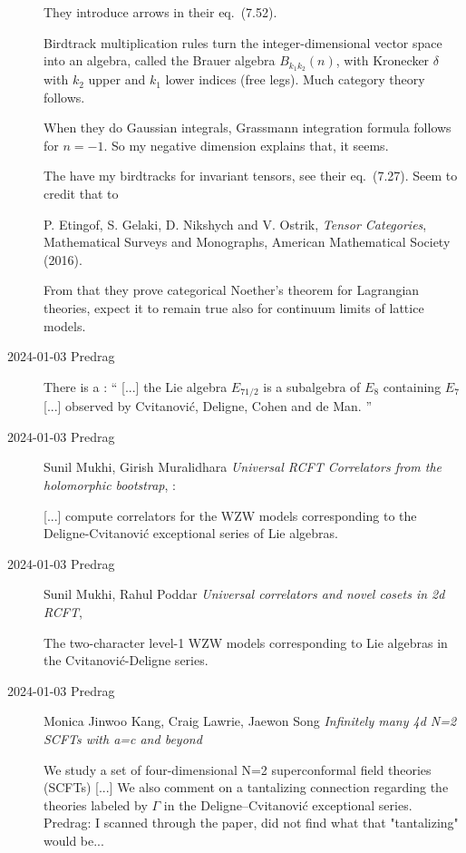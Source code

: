\begin{description}
They introduce arrows in their eq.~(7.52).

Birdtrack multiplication rules turn the integer-dimensional vector space into an algebra,
called the Brauer algebra $B_{k_1k_2}(n)$, with Kronecker $\delta$ with
 $k_2$ upper and  $k_1$  lower indices (free legs).  Much category theory follows.

When they do Gaussian integrals, Grassmann integration formula follows for
$n=-1$. So my negative dimension explains that, it seems.

The have my birdtracks for invariant tensors, see their eq.~(7.27).
Seem to credit that to

P. Etingof, S. Gelaki, D. Nikshych and V. Ostrik,
{\em Tensor Categories}, Mathematical Surveys
and Monographs, American Mathematical Society (2016).

From that they prove categorical Noether's theorem for Lagrangian theories,
expect it to
remain true also for continuum limits of lattice models.

\item[2024-01-03 Predrag]
There is a
:
``
[...] the Lie algebra $E_{7 1/2}$ is a subalgebra of $E_{8}$ containing
$E_{7}$ [...] observed by Cvitanovi{\'c}, Deligne, Cohen and de Man.
''


\item[2024-01-03 Predrag]
Sunil Mukhi, Girish Muralidhara
{\em Universal RCFT Correlators from the holomorphic bootstrap},
:

[...] compute
correlators for the WZW models corresponding to the
Deligne-Cvitanovi{\'c} exceptional series of Lie algebras.

\item[2024-01-03 Predrag]
Sunil Mukhi, Rahul Poddar
{\em Universal correlators and novel cosets in 2d RCFT},

The two-character level-1 WZW models corresponding to Lie algebras in the
Cvitanovi{\'c}-Deligne series.

\item[2024-01-03 Predrag]
Monica Jinwoo Kang, Craig Lawrie, Jaewon Song
{\em Infinitely many 4d N=2 SCFTs with a=c and beyond}

We study a set of four-dimensional N=2 superconformal field theories
(SCFTs) [...]
We also comment on a tantalizing connection regarding the theories
labeled by $\Gamma$ in the Deligne--Cvitanovi{\'c} exceptional series.
\\
Predrag: I scanned through the paper, did not find what that "tantalizing"
would be...


\end{description}
